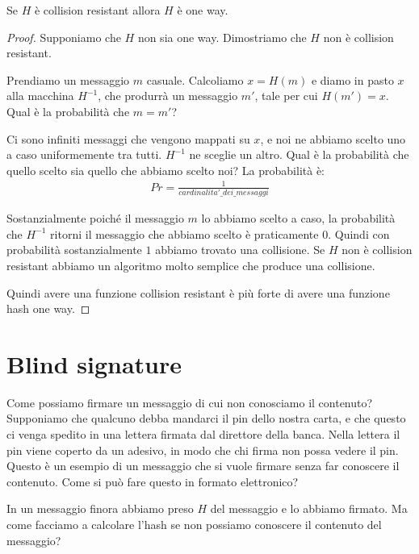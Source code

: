 \noindent Se $H$ è collision resistant allora $H$ è one way.
\begin{proof}
    Supponiamo che $H$ non sia one way. Dimostriamo che $H$ non è collision resistant. 
    
    Prendiamo un messaggio $m$ casuale. Calcoliamo $x = H(m)$ e diamo in pasto $x$ alla macchina $H^{-1}$, che produrrà un messaggio $m'$, tale per cui $H(m') = x$. Qual è la probabilità che $m=m'$? 

    Ci sono infiniti messaggi che vengono mappati su $x$, e noi ne abbiamo scelto uno a caso uniformemente tra tutti. $H^{-1}$ ne sceglie un altro. Qual è la probabilità che quello scelto sia quello che abbiamo scelto noi? La probabilità è:
    \begin{align*}
        Pr = \frac{1}{cardinalita'\_dei\_messaggi}
    \end{align*}

    \noindent Sostanzialmente poiché il messaggio $m$ lo abbiamo scelto a caso, la probabilità che $H^{-1}$ ritorni il messaggio che abbiamo scelto è praticamente $0$. Quindi con probabilità sostanzialmente $1$ abbiamo trovato una collisione. Se $H$ non è collision resistant abbiamo un algoritmo molto semplice che produce una collisione. 

    Quindi avere una funzione collision resistant è più forte di avere una funzione hash one way.
\end{proof}

\section{Blind signature}

Come possiamo firmare un messaggio di cui non conosciamo il contenuto? Supponiamo che qualcuno debba mandarci il pin dello nostra carta, e che questo ci venga spedito in una lettera firmata dal direttore della banca. Nella lettera il pin viene coperto da un adesivo, in modo che chi firma non possa vedere il pin. Questo è un esempio di un messaggio che si vuole firmare senza far conoscere il contenuto. Come si può fare questo in formato elettronico?

In un messaggio finora abbiamo preso $H$ del messaggio e lo abbiamo firmato. Ma come facciamo a calcolare l'hash se non possiamo conoscere il contenuto del messaggio?

